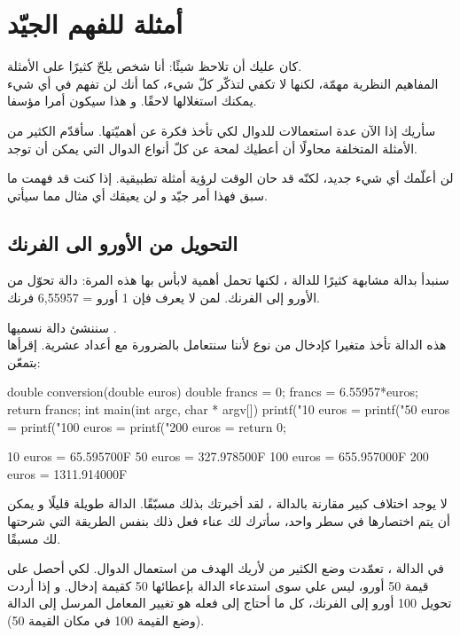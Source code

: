 \section{أمثلة للفهم الجيّد}

كان عليك أن تلاحظ شيئًا: أنا شخص يلحّ كثيرًا على الأمثلة.\\
المفاهيم النظرية مهمّة، لكنها لا تكفي لتذكّر كلّ شيء، كما أنك لن تفهم في أي شيء يمكنك استغلالها لاحقًا. و هذا سيكون أمرا مؤسفا.

سأريك إذا الآن عدة استعمالات للدوال لكي تأخذ فكرة عن أهميّتها. سأقدّم الكثير من الأمثلة المتخلفة محاولًا أن أعطيك لمحة عن كلّ أنواع الدوال التي يمكن أن توجد.

لن أعلّمك أي شيء جديد، لكنّه قد حان الوقت لرؤية أمثلة تطبيقية. إذا كنت قد فهمت ما سبق فهذا أمر جيّد و لن يعيقك أي مثال مما سيأتي.

\subsection{التحويل من الأورو الى الفرنك}

سنبدأ بدالة مشابهة كثيرًا للدالة
،
لكنها تحمل أهمية لابأس بها هذه المرة: دالة تحوّل من الأورو إلى الفرنك. لمن لا يعرف فإن 1 أورو = 6,55957 فرنك.

سننشئ دالة نسميها 
.\\
هذه الدالة تأخذ متغيرا كإدخال من نوع 
لأننا سنتعامل بالضرورة مع أعداد عشرية. إقرأها بتمعّن:

\begin{Csource}
double conversion(double euros)
{
	double francs = 0;
	francs = 6.55957*euros;
	return francs;
}
int main(int argc, char * argv[])
{
	printf("10 euros = %
	printf("50 euros = %
	printf("100 euros = %
	printf("200 euros = %
	return 0;
}
\end{Csource}

\begin{Console}
10 euros = 65.595700F
50 euros = 327.978500F
100 euros = 655.957000F
200 euros = 1311.914000F
\end{Console}

لا يوجد اختلاف كبير مقارنة بالدالة 
،
لقد أخبرتك بذلك مسبّقًا. الدالة 
طويلة قليلًا و يمكن أن يتم اختصارها في سطر واحد، سأترك لك عناء فعل ذلك بنفس الطريقة التي شرحتها لك مسبقًا.

في الدالة
،
تعمّدت وضع الكثير من
لأريك الهدف من استعمال الدوال. لكي أحصل على قيمة 50 أورو، ليس علي سوى استدعاء الدالة 
بإعطائها 50 كقيمة إدخال. و إذا أردت تحويل 100 أورو إلى الفرنك، كل ما أحتاج إلى فعله هو تغيير المعامل المرسل إلى الدالة (وضع القيمة 100 في مكان القيمة 50).

